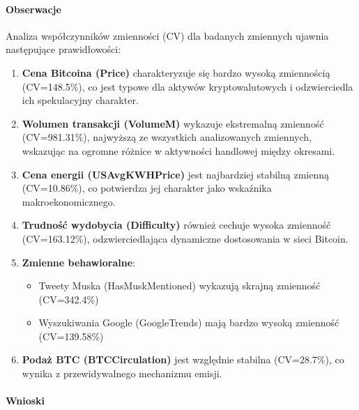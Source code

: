 \documentclass[
  11pt,
]{article}
\providecommand{\tightlist}{%
  \setlength{\itemsep}{0pt}\setlength{\parskip}{0pt}}
\begin{document}
\paragraph{Obserwacje}\label{obserwacje-4}

Analiza współczynników zmienności (CV) dla badanych zmiennych ujawnia
następujące prawidłowości:

\begin{enumerate}
\def\labelenumi{\arabic{enumi}.}
\item
  \textbf{Cena Bitcoina (Price)} charakteryzuje się bardzo wysoką
  zmiennością (CV=148.5\%), co jest typowe dla aktywów kryptowalutowych
  i odzwierciedla ich spekulacyjny charakter.
\item
  \textbf{Wolumen transakcji (VolumeM)} wykazuje ekstremalną zmienność
  (CV=981.31\%), najwyższą ze wszystkich analizowanych zmiennych,
  wskazując na ogromne różnice w aktywności handlowej między okresami.
\item
  \textbf{Cena energii (USAvgKWHPrice)} jest najbardziej stabilną
  zmienną (CV=10.86\%), co potwierdza jej charakter jako wskaźnika
  makroekonomicznego.
\item
  \textbf{Trudność wydobycia (Difficulty)} również cechuje wysoka
  zmienność (CV=163.12\%), odzwierciedlająca dynamiczne dostosowania w
  sieci Bitcoin.
\item
  \textbf{Zmienne behawioralne}:

  \begin{itemize}
  \tightlist
  \item
    Tweety Muska (HasMuskMentioned) wykazują skrajną zmienność
    (CV=342.4\%)
  \item
    Wyszukiwania Google (GoogleTrends) mają bardzo wysoką zmienność
    (CV=139.58\%)
  \end{itemize}
\item
  \textbf{Podaż BTC (BTCCirculation)} jest względnie stabilna
  (CV=28.7\%), co wynika z przewidywalnego mechanizmu emisji.
\end{enumerate}

\paragraph{Wnioski}\label{wnioski-4}
\end{document}
